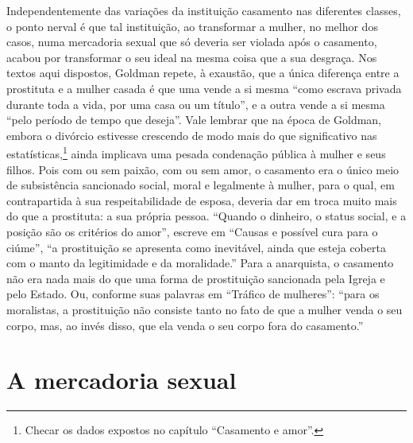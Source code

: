 Independentemente das variações da instituição casamento nas diferentes
classes, o ponto nerval é que tal instituição, ao transformar a mulher,
no melhor dos casos, numa mercadoria sexual que só deveria ser violada
após o casamento, acabou por transformar o seu ideal na mesma coisa que
a sua desgraça. Nos textos aqui dispostos, Goldman repete, à exaustão,
que a única diferença entre a prostituta e a mulher casada é que uma
vende a si mesma ``como escrava privada durante toda a vida, por uma
casa ou um título'', e a outra vende a si mesma ``pelo período de tempo
que deseja''. Vale lembrar que na época de Goldman, embora o divórcio
estivesse crescendo de modo mais do que significativo nas estatísticas,\footnote{Checar os dados expostos no capítulo ``Casamento e amor''.} ainda implicava uma
pesada condenação pública à mulher e seus filhos. Pois com ou sem
paixão, com ou sem amor, o casamento era o único meio de subsistência
sancionado social, moral e legalmente à mulher, para o qual, em
contrapartida à sua respeitabilidade de esposa, deveria dar em troca
muito mais do que a prostituta: a sua própria pessoa. ``Quando o
dinheiro, o status social, e a posição são os critérios do amor'',
escreve em ``Causas e possível cura para o ciúme'', ``a prostituição se
apresenta como inevitável, ainda que esteja coberta com o manto da
legitimidade e da moralidade.'' Para a anarquista, o casamento não era
nada mais do que uma forma de prostituição sancionada pela Igreja e pelo
Estado. Ou, conforme suas palavras em ``Tráfico de mulheres'': ``para os
moralistas, a prostituição não consiste tanto no fato de que a mulher
venda o seu corpo, mas, ao invés disso, que ela venda o seu corpo fora
do casamento.''

\section{A mercadoria sexual}

